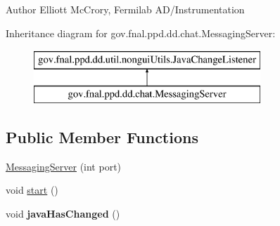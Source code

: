 \begin{DoxyAuthor}{Author}
Elliott Mc\-Crory, Fermilab A\-D/\-Instrumentation 
\end{DoxyAuthor}
Inheritance diagram for gov.\-fnal.\-ppd.\-dd.\-chat.\-Messaging\-Server\-:\begin{figure}[H]
\begin{center}
\leavevmode
\includegraphics[height=2.000000cm]{classgov_1_1fnal_1_1ppd_1_1dd_1_1chat_1_1MessagingServer}
\end{center}
\end{figure}
\subsection*{Public Member Functions}
\begin{DoxyCompactItemize}
\item 
\hyperlink{classgov_1_1fnal_1_1ppd_1_1dd_1_1chat_1_1MessagingServer_a9b02c801edad834dcc2a0c96071900af}{Messaging\-Server} (int port)
\item 
void \hyperlink{classgov_1_1fnal_1_1ppd_1_1dd_1_1chat_1_1MessagingServer_a69cf69b0f944a33ba7e1b9c32dd60ee6}{start} ()
\item 
\hypertarget{classgov_1_1fnal_1_1ppd_1_1dd_1_1chat_1_1MessagingServer_a8ca524f1db3320d40d3e5c0144802765}{void {\bfseries java\-Has\-Changed} ()}\label{classgov_1_1fnal_1_1ppd_1_1dd_1_1chat_1_1MessagingServer_a8ca524f1db3320d40d3e5c0144802765}

\end{DoxyCompactItemize}
